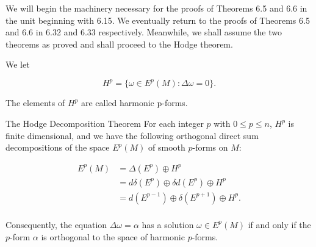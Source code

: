 We will begin the machinery necessary for the proofs of Theorems 6.5 and 6.6 in the unit beginning with 6.15. We eventually return to the proofs of Theorems 6.5 and 6.6 in 6.32 and 6.33 respectively. Meanwhile, we shall assume the two theorems as proved and shall proceed to the Hodge theorem.

\begin{definition}\label{thm:6.7}
We let

\begin{equation}
\tag{1}\label{eq:6.7:1}
H^{p}=\{\omega\in E^{p}(M)\colon\Delta\omega=0\}.
\end{equation}

The elements of  $ H^{p} $ are called harmonic p-forms.
\end{definition}

\begin{theorem}{The Hodge Decomposition Theorem}\label{thm:6.8}
For each integer $p$ with $0 \leq p \leq n$, $H^p$ is finite dimensional, and we have the following orthogonal direct sum decompositions of the space $E^p(M)$ of smooth $p$-forms on $M$: 

\begin{equation}
\tag{1}\label{eq:6.8:1}
\begin{aligned}{E^{p}(M)}&{{}=\Delta(E^{p})\oplus H^{p}}\\ {}&{{}=d\delta(E^{p})\oplus\delta d(E^{p})\oplus H^{p}}\\ {}&{{}=d(E^{p-1})\oplus\delta(E^{p+1})\oplus H^{p}.}\\ \end{aligned}
\end{equation}

Consequently, the equation $\Delta\omega = \alpha$ has a solution $\omega \in E^p(M)$ if and only if the $p$-form $\alpha$ is orthogonal to the space of harmonic $p$-forms.
\end{theorem}

